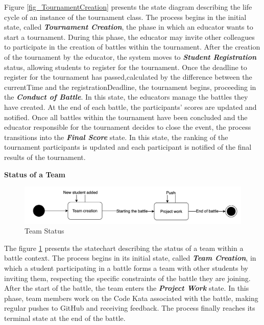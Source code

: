 Figure \ref{fig_TournamentCreation} presents the state diagram describing the life cycle of an instance of the tournament class.
\newline
The process begins in the initial state, called \textbf{\textit{Tournament Creation}}, the phase in which an educator wants to start a tournament. During this phase, the educator may invite other colleagues to participate in the creation of battles within the tournament.
\newline
After the creation of the tournament by the educator, the system moves to \textbf{\textit{Student Registration}} status, allowing students to register for the tournament.
\newline
Once the deadline to register for the tournament has passed,calculated by the difference between the currentTime and the registrationDeadline, the tournament begins, proceeding in the \textbf{\textit{Conduct of Battle}}. In this state, the educators manage the battles they have created. At the end of each battle, the participants' scores are updated and notified.
\newline
Once all battles within the tournament have been concluded and the educator responsible for the tournament decides to close the event, the process transitions into the \textbf{\textit{Final Score}} state. In this state, the ranking of the tournament participants is updated and each participant is notified of the final results of the tournament.



\vspace{1.5\baselineskip}
\textbf{Status of a Team}

\begin{figure}[h]
    \centering
    \includegraphics[scale=0.5]{images/Statecharts/TeamStatus.png} 
    \caption{Team Status}
    \label{fig_TeamStatus}
\end{figure}

The figure \ref{fig_TeamStatus} presents the statechart describing the status of a team within a battle context.
\newline
The process begins in its initial state, called \textbf{\textit{Team Creation}}, in which a student participating in a battle forms a team with other students by inviting them, respecting the specific constraints of the battle they are joining.
\newline
After the start of the battle, the team enters the \textbf{\textit{Project Work}} state. In this phase, team members work on the Code Kata associated with the battle, making regular pushes to GitHub and receiving feedback.
\newline
The process finally reaches its terminal state at the end of the battle.


